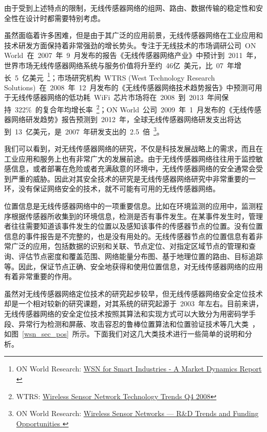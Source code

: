 \documentclass[a4paper,10pt]{article}
\begin{document}
由于受到上述特点的限制，无线传感器网络的组网、路由、数据传输的稳定性和安全性在设计时都需要特别考虑。

虽然面临着许多困难，但是由于其广泛的应用前景，无线传感器网络在工业应用和技术研发方面保持着非常强劲的增长势头。专注于无线技术的市场调研公司~ON World~在~2007~年~9~月发布的报告《无线传感器网络产业》中预计到~2011~年，世界市场无线传感器网络系统与服务价值将升至约~46亿~美元，比~07~年增长~5~亿美元~\footnote{ON World Research: \href{http://onworld.com/smartindustries/}{WSN for Smart Industries - A Market Dynamics Report }}；市场研究机构~WTRS (West Technology
Research Solutions)~在~2008~年~12~月发布的《无线传感器网络技术趋势报告》中预测可用于无线传感器网络的低功耗~WiFi~芯片市场将在~2008~到~2013~年间保持~322\%~的复合年均增长率~\footnote{WTRS: \href{http://www.wtrs.net/wcntechtrends.htm}{Wireless Sensor Network Technology Trends Q4 2008}}；ON World~公司~2009~年~1~月发布的《无线传感器网络研发趋势》报告预测到~2012~年，全球无线传感器网络研发支出将达到~13~亿美元，是~2007~年研发支出的~2.5~倍~\footnote{ON World Research: \href{http://onworld.com/wsn/}{Wireless Sensor Networks — R\&D Trends and Funding Opportunities }}。

我们可以看到，对无线传感器网络的研究，不仅是科技发展战略上的需求，而且在工业应用和服务上也有非常广大的发展前途。由于无线传感器网络往往用于监控敏感信息，或者部署在危险或者充满敌意的环境中，无线传感器网络的安全通常会受到严重的威胁。因此对其安全技术的研究是无线传感器网络研究中非常重要的一环，没有保证网络安全的技术，就不可能有可用的无线传感器网络。

位置信息是无线传感器网络中的一项重要信息。比如在环境监测的应用中，监测程序根据传感器所收集到的环境信息，检测是否有事件发生。在某事件发生时，管理者往往需要知道该事件发生的位置以及感知该事件的传感器节点的位置。没有位置信息的事件报告是不完整的，也是没有用处的。无线传感器节点的位置信息有着非常广泛的应用，包括数据的识别和关联、节点定位、对指定区域节点的管理和查询、评估节点密度和覆盖范围、网络能量分布图、基于地理位置的路由、目标追踪等。因此，保证节点正确、安全地获得和使用位置信息，对无线传感器网络的应用有着非常重要的作用。

虽然对无线传感器网络定位技术的研究起步较早，但无线传感器网络安全定位技术却是一个相对较新的研究课题，对其系统的研究起源于~2003~年左右。目前来讲，无线传感器网络的安全定位技术按照其算法和实现方式可以大致分为用密码学手段、异常行为检测和屏蔽、攻击容忍的鲁棒位置算法和位置验证技术等几大类~\cite{Boukerche2008}，如图~\ref{wsn_sec_pos}~所示。下面我们对这几大类技术进行一些简单的说明和分析。
\end{document}
